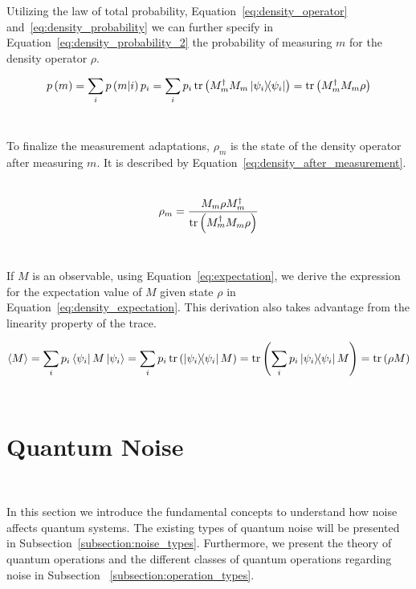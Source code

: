 Utilizing the law of total probability, Equation~\ref{eq:density_operator}
and~\ref{eq:density_probability} we can further specify in 
Equation~\ref{eq:density_probability_2} the probability of measuring
\(m\) for the density operator \(\rho\). \

\begin{equation}\label{eq:density_probability_2}
  p\left(m\right) = \sum_{i}p\left(m|i\right)p_{i} =
  \sum_{i}p_{i}\trace\left(M_{m}^{\dag}M_{m}\ketbra{\psi_i}{\psi_i}\right) =
  \trace\left(M_{m}^{\dag}M_{m}\rho \right)
\end{equation} \

To finalize the measurement adaptations, \(\rho_m\) is the state of
the density operator after measuring \(m\). It is described by
Equation~\ref{eq:density_after_measurement}. \

\begin{equation}\label{eq:density_after_measurement}
  \rho_m = 
  \frac{M_{m}\rho M_{m}^{\dag}}{\trace\left(M_{m}^{\dag}M_{m}\rho\right)}
\end{equation} \

If \(M\) is an observable, using Equation~\ref{eq:expectation}, we derive
the expression for the expectation value of \(M\) given state \(\rho\)
in Equation~\ref{eq:density_expectation}. This derivation also takes 
advantage from the linearity property of the trace. \

\begin{equation}\label{eq:density_expectation}
  \ev{M} = \sum_{i}p_i\bra{\psi_i}M\ket{\psi_i} =
  \sum_{i}p_i\trace\left(\ketbra{\psi_i}{\psi_i}M\right) =
  \trace\left(\sum_{i}p_i\ketbra{\psi_i}{\psi_i}M\right) =
  \trace\left(\rho M\right)
\end{equation} \




\section{Quantum Noise}\label{section:noise} \

In this section we introduce the fundamental concepts to understand
how noise affects quantum systems. The existing types of quantum noise
will be presented in Subsection~\ref{subsection:noise_types}. Furthermore,
we present the theory of quantum operations and the different classes of
quantum operations regarding noise in Subsection
~\ref{subsection:operation_types}. \

